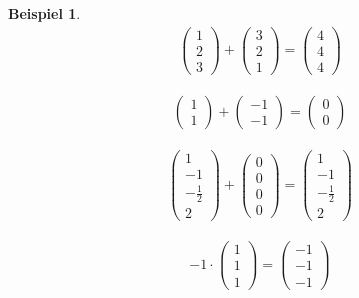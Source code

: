 \documentclass[]{article}
\newtheorem{Beispiel}{Beispiel}
\begin{document}
\begin{Beispiel}
\begin{align*}
\begin{pmatrix}
1 \\ 2  \\  3
\end{pmatrix}  +  
\begin{pmatrix}
3 \\ 2  \\ 1
\end{pmatrix} 
=  \begin{pmatrix}
4 \\ 4  \\ 4
\end{pmatrix} 
\end{align*}

\begin{align*}
\begin{pmatrix}
 1 \\  1 
\end{pmatrix}  +  
\begin{pmatrix}
-1  \\  -1 
\end{pmatrix} 
=  \begin{pmatrix}
0  \\  0 
\end{pmatrix}  
\end{align*}

\begin{align*}
\begin{pmatrix}
1 \\ -1  \\  -\frac{1}{2}  \\ 2 
\end{pmatrix}  +  
\begin{pmatrix}
0  \\  0 \\  0 \\ 0
\end{pmatrix} 
=  \begin{pmatrix}
1 \\ -1  \\  -\frac{1}{2}  \\ 2 
\end{pmatrix} 
\end{align*}

\begin{align*}
-1 \cdot
\begin{pmatrix}
1 \\ 1  \\  1 
\end{pmatrix}  
=  \begin{pmatrix}
-1   \\ -  1    \\  -1  
\end{pmatrix} 
\end{align*}


\end{Beispiel}
\end{document}
